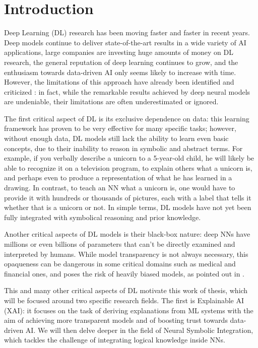 \chapter{Introduction}
\label{introduction}

Deep Learning (DL) research has been moving faster and faster in recent years. Deep models continue to deliver state-of-the-art results in a wide variety of AI applications, large companies are investing huge amounts of money on DL research, the general reputation of deep learning continues to grow, and the enthusiasm towards data-driven AI only seems likely to increase with time. However, the limitations of this approach have already been identified and criticized \cite{marcus2018appraisal}: in fact, while the remarkable results achieved by deep neural models are undeniable, their limitations are often underestimated or ignored.

The first critical aspect of DL is its exclusive dependence on data: this learning framework has proven to be very effective for many specific tasks; however, without enough data, DL models still lack the ability to learn even basic concepts, due to their inability to reason in symbolic and abstract terms. For example, if you verbally describe a unicorn to a 5-year-old child, he will likely be able to recognize it on a television program, to explain others what a unicorn is, and perhaps even to produce a representation of what he has learned in a drawing. In contrast, to teach an NN what a unicorn is, one would have to provide it with hundreds or thousands of pictures, each with a label that tells it whether that is a unicorn or not. In simple terms, DL models have not yet been fully integrated with symbolical reasoning and prior knowledge. 

Another critical aspects of DL models is their black-box nature: deep NNs have millions or even billions of parameters that can't be directly examined and interpreted by humans.
While model transparency is not always necessary, this opaqueness can be dangerous in some critical domains such as medical and financial ones, and poses the risk of heavily biased models, as pointed out in \cite{o2016weapons}.

This and many other critical aspects of DL motivate this work of thesis, which will be focused around two specific research fields. The first is Explainable AI (XAI): it focuses on the task of deriving explanations from ML systems with the aim of achieving more transparent models and of boosting trust towards data-driven AI. We will then delve deeper in the field of Neural Symbolic Integration, which tackles the challenge of integrating logical knowledge inside NNs.

